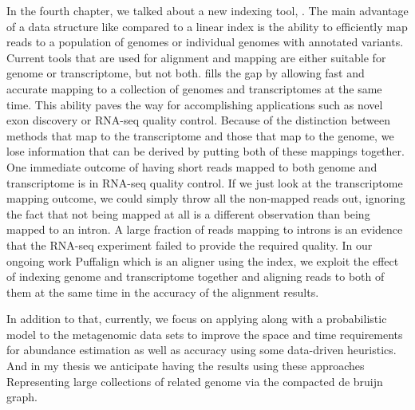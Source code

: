 In the fourth chapter, we talked about a new indexing tool, \pufferfish.
The main advantage of a data structure like \pufferfish compared to a linear index
is the ability to efficiently map reads to a population of genomes or individual genomes
with annotated variants.
Current tools that are used for alignment and mapping are either suitable for genome or transcriptome,
but not both. \pufferfish fills the gap by allowing fast and accurate mapping
to a collection of genomes and transcriptomes at the same time.
This ability paves the way for accomplishing applications such as novel exon discovery
or RNA-seq quality control.
Because of the distinction between methods that map to the transcriptome
and those that map to the genome,
we lose information that can be derived by putting both of these mappings together.
One immediate outcome of having short reads mapped to both genome and transcriptome
is in RNA-seq quality control.
If we just look at the transcriptome mapping outcome,
we could simply throw all the non-mapped reads out,
ignoring the fact that not being mapped at all is a different observation than being mapped to an intron.
A large fraction of reads mapping to introns is an evidence that the RNA-seq experiment
failed to provide the required quality.
In our ongoing work Puffalign which is an aligner using the \pufferfish index,
we exploit the effect of indexing genome and transcriptome together and aligning reads to
both of them at the same time in the accuracy of the alignment results.

In addition to that, currently, we focus on applying \pufferfish
along with a probabilistic model to the metagenomic data sets
to improve the space and time requirements for abundance estimation
as well as accuracy using some data-driven heuristics.
And in my thesis we anticipate having the results using these approaches
Representing large collections of related genome via the compacted de bruijn graph.



